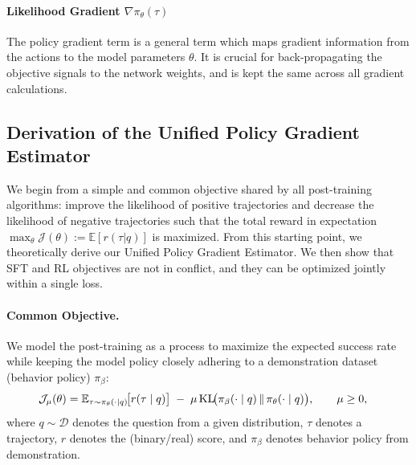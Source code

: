 \paragraph{Likelihood Gradient $\nabla \pi_\theta (\tau)$} The policy gradient term is a general term which maps gradient information from the actions to the model parameters $\theta$. It is crucial for back-propagating the objective signals to the network weights, and is kept the same across all gradient calculations. 














\subsection{Derivation of the Unified Policy Gradient Estimator}
\label{sec:shared-common-objective}


We begin from a simple and common objective shared by all post-training algorithms: improve the likelihood of positive trajectories and decrease the likelihood of negative trajectories such that the total reward in expectation $\max_{\theta} \mathcal{J} (\theta) := \mathbb{E} [r(\tau|q)]$ is maximized.
From this starting point, we theoretically derive our Unified Policy Gradient Estimator. We then show that SFT and RL objectives are not in conflict, and they can be optimized jointly within a single loss.

\paragraph{Common Objective.}
We model the post-training as a process to maximize the expected success rate while keeping the model policy closely adhering to a demonstration dataset (behavior policy) $\pi_\beta$:
\begin{equation}
\label{eq:master_obj}
\begin{aligned}
\mathcal{J}_{\mu}(\theta)
&= \mathbb{E}_{\tau\sim \pi_\theta(\cdot\mid q)}\!\big[r(\tau\mid q)\big]
\;-\; \mu\,\mathrm{KL}\!\big(\pi_\beta(\cdot\mid q)\,\|\,\pi_\theta(\cdot\mid q)\big),
\qquad \mu\ge 0,
\end{aligned}
\end{equation}
where $q\!\sim\!\mathcal{D}$ denotes the question from a given distribution, $\tau$ denotes a trajectory, $r$ denotes the (binary/real) score, and $\pi_\beta$ denotes behavior policy from demonstration.


